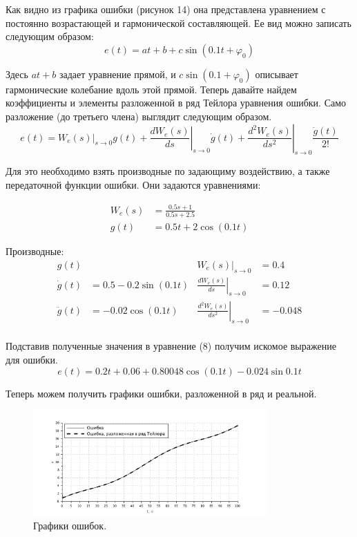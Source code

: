 \documentclass[a3paper, 11pt]{article}
\begin{document}
Как видно из графика ошибки (рисунок 14) она представлена уравнением с постоянно возрастающей и гармонической составляющей. Ее вид можно записать следующим образом: 
\begin{equation}
    e(t) = at + b + c\sin{(0.1t + \varphi_0)}
\end{equation}
\par
Здесь $at + b$ задает уравнение прямой, и $c\sin{(0.1 + \varphi_0)}$ описывает гармонические колебание вдоль этой прямой. Теперь давайте найдем коэффициенты и элементы разложенной в ряд Тейлора уравнения ошибки. Само разложение (до третьего члена) выглядит следующим образом. 
\begin{equation}
    e(t) = W_e(s)|_{s\rightarrow0}g(t) + \left.\frac{dW_e(s)}{ds}\right|_{s\rightarrow0}\dot{g}(t) + \left.\frac{d^2W_e(s)}{ds^2}\right|_{s\rightarrow0}\frac{\ddot{g}(t)}{2!}
\end{equation}

Для это необходимо взять производные по задающиму воздействию, а также передаточной функции ошибки. Они задаются уравнениями: 

\begin{align}
    W_{e}(s) & = \frac{0.5s + 1}{0.5s + 2.5} \\ 
    g(t) & = 0.5t + 2\cos{(0.1t)}
\end{align}
\par

Производные:
\begin{align*}
    g(t) & & W_e(s)|_{s\rightarrow0} & = 0.4 \\
    \dot{g}(t) & = 0.5 - 0.2\sin{(0.1t)} & \left.\frac{dW_e(s)}{ds}\right|_{s\rightarrow0} & = 0.12 \\
    \ddot{g}(t) & = -0.02\cos{(0.1t)} & \left.\frac{d^2W_e(s)}{ds^2}\right|_{s\rightarrow0} & = -0.048 \\
\end{align*}
\par

Подставив полученные значения в уравнение (8) получим искомое выражение для ошибки.
\begin{equation}
    e(t) = 0.2t + 0.06 + 0.80048\cos{(0.1t)} - 0.024\sin{0.1t}
\end{equation}
\par
Теперь можем получить графики ошибки, разложенной в ряд и реальной.
\begin{figure}[h!]
    \centering
    \includegraphics[width = 0.8\textwidth]{images/graph4withTailor.pdf}
    \caption{Графики ошибок.}
\end{figure}
\end{document}
